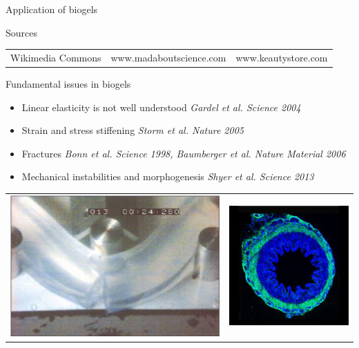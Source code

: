 \documentclass[xcolor=table]{beamer}
\begin{document}
\begin{frame}{Application of biogels}
\begin{footnotesize}
\begin{block}{Sources}
\begin{tabu}{lXl}
Wikimedia Commons & www.madaboutscience.com & www.keautystore.com\\
\end{tabu}
\end{block}
\end{footnotesize}
\end{frame}



\begin{frame}{Fundamental issues in biogels}
\begin{itemize}
\item Linear elasticity is not well understood \textit{\scriptsize Gardel et al. Science 2004}
\item Strain and stress stiffening \textit{\scriptsize Storm et al. Nature 2005}
\item Fractures \textit{\scriptsize Bonn et al. Science 1998, Baumberger et al. Nature Material 2006}
\item Mechanical instabilities and morphogenesis \textit{\scriptsize Shyer et al. Science 2013}
\end{itemize}
\begin{tabu}{X[c]X[c]}
\includegraphics[height=6\baselineskip]{Bonn_fracture} &
\includegraphics[height=6\baselineskip]{Villi_sq}

\end{tabu}
\end{frame}
\end{document}
